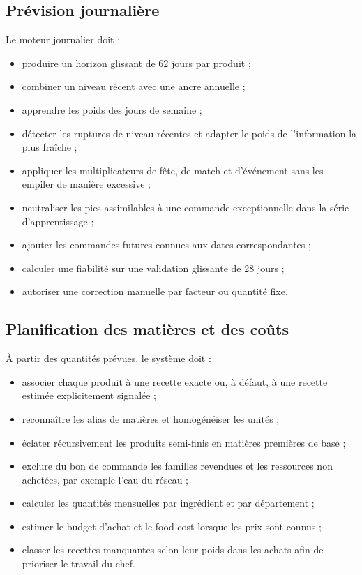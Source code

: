 \subsection{Prévision journalière}

Le moteur journalier doit :

\begin{itemize}
  \item produire un horizon glissant de 62 jours par produit ;
  \item combiner un niveau récent avec une ancre annuelle ;
  \item apprendre les poids des jours de semaine ;
  \item détecter les ruptures de niveau récentes et adapter le poids de
  l'information la plus fraîche ;
  \item appliquer les multiplicateurs de fête, de match et d'événement sans les
  empiler de manière excessive ;
  \item neutraliser les pics assimilables à une commande exceptionnelle dans la
  série d'apprentissage ;
  \item ajouter les commandes futures connues aux dates correspondantes ;
  \item calculer une fiabilité sur une validation glissante de 28 jours ;
  \item autoriser une correction manuelle par facteur ou quantité fixe.
\end{itemize}

\subsection{Planification des matières et des coûts}

À partir des quantités prévues, le système doit :

\begin{itemize}
  \item associer chaque produit à une recette exacte ou, à défaut, à une recette
  estimée explicitement signalée ;
  \item reconnaître les alias de matières et homogénéiser les unités ;
  \item éclater récursivement les produits semi-finis en matières premières de
  base ;
  \item exclure du bon de commande les familles revendues et les ressources non
  achetées, par exemple l'eau du réseau ;
  \item calculer les quantités mensuelles par ingrédient et par département ;
  \item estimer le budget d'achat et le food-cost lorsque les prix sont connus ;
  \item classer les recettes manquantes selon leur poids dans les achats afin de
  prioriser le travail du chef.
\end{itemize}

